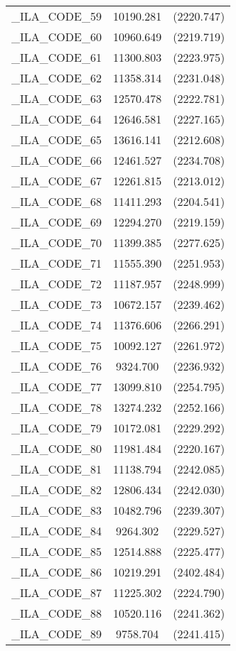 {\begin{table}[htbp]
\begin{tabular}{l c c }
\_ILA\_CODE\_59  &  10190.281  & (2220.747)\\
\_ILA\_CODE\_60  &  10960.649  & (2219.719)\\
\_ILA\_CODE\_61  &  11300.803  & (2223.975)\\
\_ILA\_CODE\_62  &  11358.314  & (2231.048)\\
\_ILA\_CODE\_63  &  12570.478  & (2222.781)\\
\_ILA\_CODE\_64  &  12646.581  & (2227.165)\\
\_ILA\_CODE\_65  &  13616.141  & (2212.608)\\
\_ILA\_CODE\_66  &  12461.527  & (2234.708)\\
\_ILA\_CODE\_67  &  12261.815  & (2213.012)\\
\_ILA\_CODE\_68  &  11411.293  & (2204.541)\\
\_ILA\_CODE\_69  &  12294.270  & (2219.159)\\
\_ILA\_CODE\_70  &  11399.385  & (2277.625)\\
\_ILA\_CODE\_71  &  11555.390  & (2251.953)\\
\_ILA\_CODE\_72  &  11187.957  & (2248.999)\\
\_ILA\_CODE\_73  &  10672.157  & (2239.462)\\
\_ILA\_CODE\_74  &  11376.606  & (2266.291)\\
\_ILA\_CODE\_75  &  10092.127  & (2261.972)\\
\_ILA\_CODE\_76  &  9324.700  & (2236.932)\\
\_ILA\_CODE\_77  &  13099.810  & (2254.795)\\
\_ILA\_CODE\_78  &  13274.232  & (2252.166)\\
\_ILA\_CODE\_79  &  10172.081  & (2229.292)\\
\_ILA\_CODE\_80  &  11981.484  & (2220.167)\\
\_ILA\_CODE\_81  &  11138.794  & (2242.085)\\
\_ILA\_CODE\_82  &  12806.434  & (2242.030)\\
\_ILA\_CODE\_83  &  10482.796  & (2239.307)\\
\_ILA\_CODE\_84  &  9264.302  & (2229.527)\\
\_ILA\_CODE\_85  &  12514.888  & (2225.477)\\
\_ILA\_CODE\_86  &  10219.291  & (2402.484)\\
\_ILA\_CODE\_87  &  11225.302  & (2224.790)\\
\_ILA\_CODE\_88  &  10520.116  & (2241.362)\\
\_ILA\_CODE\_89  &  9758.704  & (2241.415)\\

\end{tabular}
\end{table}}
